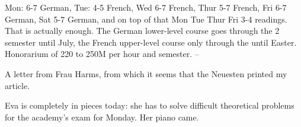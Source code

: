 Mon: 6-7 German, Tue: 4-5 French, Wed 6-7 French, Thur 5-7 French, Fri 6-7 German, Sat 5-7 German, and on top of that Mon Tue Thur Fri 3-4 readings. That is actually enough. The German lower-level course goes through the 2 semester until July, the French upper-level course only through the  until Easter. Honorarium of 220 to 250M per hour and semester. --

A letter from Frau Harms, from which it seems that the Neuesten printed my article.

Eva is completely in pieces today: she has to solve difficult theoretical problems for the academy's exam for Monday. Her piano came.

